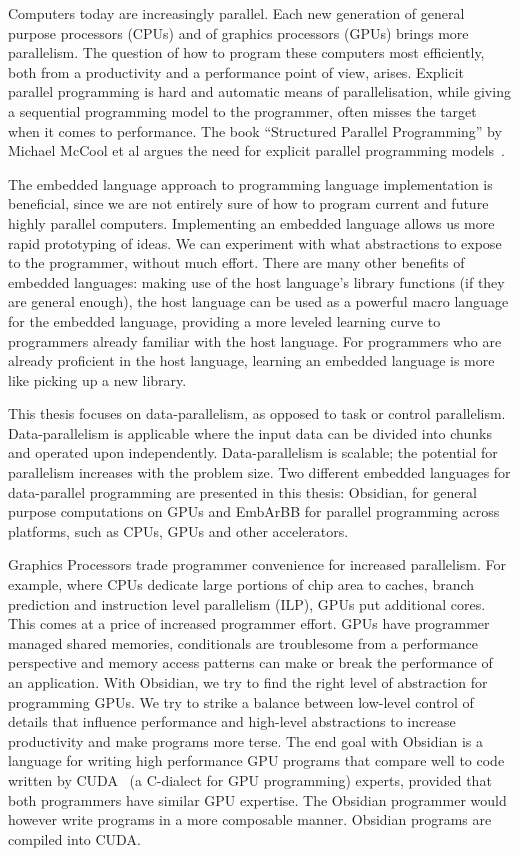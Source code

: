 \documentclass[a4paper]{book}
\begin{document}
Computers today are increasingly parallel. Each new generation of general purpose processors
(CPUs) and of graphics processors (GPUs) brings more parallelism. The question 
of how to program these computers most efficiently, both from a productivity and 
a performance point of view, arises. Explicit parallel programming is hard and automatic 
means of parallelisation, while giving a sequential programming model to the programmer, 
often misses the target when it comes to performance. The book ``Structured Parallel 
Programming'' by Michael McCool et al argues the need for explicit parallel programming 
models~\citet{STRUCTURED}.

The embedded language approach to programming language implementation is beneficial, 
since we are not entirely sure of how to program current and future highly parallel 
computers. Implementing an embedded language allows us more rapid prototyping of ideas. 
We can experiment with what abstractions to expose to the programmer, without much 
effort. There are many other benefits of embedded languages: making use 
of the host language's library functions (if they are general enough), the host language 
can be used as a powerful macro language for the embedded language, providing a more 
leveled learning curve to programmers already familiar with the host language. 
For programmers who are already proficient in the host language, learning an embedded 
language is more like picking up a new library. 

This thesis focuses on data-parallelism, as opposed to task or control parallelism.
Data-parallelism is applicable where the input data can be divided into chunks
and operated upon independently. Data-parallelism is scalable; the potential 
for parallelism increases with the problem size. Two different embedded languages 
for data-parallel programming are presented in this thesis: Obsidian, for 
general purpose computations on GPUs and EmbArBB for parallel programming across 
platforms, such as CPUs, GPUs and other accelerators. 

Graphics Processors trade programmer convenience for increased parallelism. 
For example, where CPUs dedicate large portions of chip area to caches, branch 
prediction and instruction level parallelism (ILP), GPUs put additional cores. 
This comes at a price of increased programmer effort. GPUs have programmer managed 
shared memories, conditionals are troublesome from a performance 
perspective and memory access patterns can make or break the performance of an 
application. With Obsidian, we try to find the right level of abstraction for 
programming GPUs. We try to strike a balance between low-level control of details 
that influence performance and high-level abstractions to increase productivity and 
make programs more terse. The end goal with Obsidian is a language for writing 
high performance GPU programs that compare well to code written by CUDA~\citet{CUDA}  
(a C-dialect for GPU programming) experts, provided that both programmers have 
similar GPU expertise. The Obsidian programmer would however write programs in a more 
composable manner. Obsidian programs are compiled into CUDA.  
\end{document}
